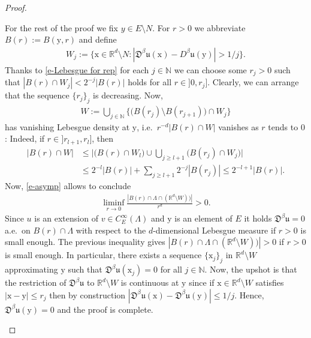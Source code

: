 \documentclass[10pt,leqno]{amsart}
\theoremstyle{definition}
\numberwithin{equation}{section}
\begin{document}
\begin{proof}
\begin{enumerate}
  For the rest of the proof we fix $y \in E \setminus N$. For $r>0$ we
  abbreviate $B(r):=B({{\mathrm y}},r)$ and define
  \begin{align}\label{d-set_quasicontinuity1}
  W_j:=\{ {{\mathrm x}} \in {{\mathbb R}}^d \setminus N: |\mathfrak{D}^\beta {{\mathfrak u}}({{\mathrm x}}) - D^\beta {{\mathfrak u}}({{\mathrm y}})|
  > 1/j\}.
  \end{align}
  Thanks to \eqref{e-Lebesgue for rep} for each $j \in {{\mathbb N}}$ we can choose some 
  $r_j > 0$ such that $|B(r) \cap W_j| < 2^{-j} |B(r)|$ holds for all $r \in
  {]0,r_j]}$. Clearly, we can arrange that the sequence $\{r_j\}_j$
  is decreasing. Now, 
  \begin{align} \label{d-set_quasicontinuity2}
  W:= \bigcup_{j \in {{\mathbb N}}} \Big \{ \big(B(r_j) \setminus B(r_{j+1})\big) \cap W_j
  \Big \}
  \end{align}
  has vanishing Lebesgue density at ${{\mathrm y}}$, i.e.\ $r^{-d}|B(r) \cap W|$ vanishes
  as $r$ tends to $0$: Indeed, if $r \in {]r_{l+1}, r_l]}$, then
  \begin{align*}
  |B(r) \cap W| 
  &\leq \Big| \big(B(r) \cap W_l\big) \cup \bigcup_{j \geq l+1} 
  \big(B(r_j) \cap W_j \big)\Big| \\
  &\leq 2^{-l}|B(r)| + \sum_{j \geq l+1} 2^{-j}|B(r_j)| 
  \leq 2^{-l+1} |B(r)|.
  \end{align*}
  Now, \eqref{e-asymp} allows to conclude
  \begin{align*}
  \liminf_{r \to 0} \frac {|B(r) \cap 
  \Lambda \cap ({{\mathbb R}}^d \setminus W))|}{r^d} > 0.
  \end{align*}
  Since $u$ is an extension of $v \in C^\infty_E(\Lambda)$ and ${{\mathrm y}}$ is an
  element of $E$ it holds $\mathfrak{D}^\beta {{\mathfrak u}} = 0$ a.e.\ on $B(r) \cap
  \Lambda$ with respect to the $d$-dimensional Lebesgue measure if $r>0$ is
  small enough. The previous inequality gives $|B(r) \cap \Lambda \cap ({{\mathbb R}}^d
  \setminus W))| > 0$ if $r>0$ is small enough. In particular, there exists a
  sequence $\{{{\mathrm x}}_j\}_j$ in ${{\mathbb R}}^d \setminus W$ approximating ${{\mathrm y}}$ such that
  $\mathfrak{D}^\beta {{\mathfrak u}}({{\mathrm x}}_j) =  0$ for all $j \in {{\mathbb N}}$. Now, the upshot is that
  the restriction of  $\mathfrak{D}^\beta {{\mathfrak u}}$ to ${{\mathbb R}}^d \setminus W$ is
  continuous at ${{\mathrm y}}$ since if ${{\mathrm x}}  \in {{\mathbb R}}^d \setminus W$ satisfies $|{{\mathrm x}} - {{\mathrm y}}|
  \leq r_j$ then by construction  $|\mathfrak{D}^\beta {{\mathfrak u}}({{\mathrm x}}) -
  \mathfrak{D}^\beta {{\mathfrak u}}({{\mathrm y}})| \leq 1/j$. Hence,  $\mathfrak{D}^\beta {{\mathfrak u}}({{\mathrm y}}) = 0$
  and the proof is complete.


\end{enumerate}
\end{proof}
\end{document}
